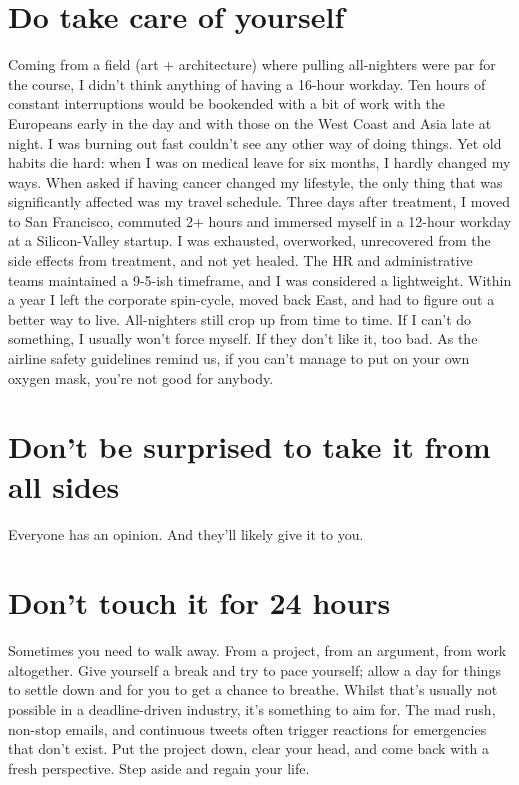 \section*{Do take care of yourself}
Coming from a field (art + architecture) where pulling all-nighters were par for the course, I didn't think anything of having a 16-hour workday. Ten hours of constant interruptions would be bookended with a bit of work with the Europeans early in the day and with those on the West Coast and Asia late at night. I was burning out fast couldn't see any other way of doing things. Yet old habits die hard: when I was on medical leave for six months, I hardly changed my ways. When asked if having cancer changed my lifestyle, the only thing that was significantly affected was my travel schedule. Three days after treatment, I moved to San Francisco, commuted 2+ hours and immersed myself in a 12-hour workday at a Silicon-Valley startup. I was exhausted, overworked, unrecovered from the side effects from treatment, and not yet healed. The HR and administrative teams maintained a 9-5-ish timeframe, and I was considered a lightweight. Within a year I left the corporate spin-cycle, moved back East, and had to figure out a better way to live. All-nighters still crop up from time to time. If I can't do something, I usually won't force myself. If they don't like it, too bad. As the airline safety guidelines remind us, if you can't manage to put on your own oxygen mask, you're not good for anybody.

\section*{Don't be surprised to take it from all sides}
Everyone has an opinion. And they'll likely give it to you.

\section*{Don't touch it for 24 hours}
Sometimes you need to walk away. From a project, from an argument, from work altogether. Give yourself a break and try to pace yourself; allow a day for things to settle down and for you to get a chance to breathe. Whilst that's usually not possible in a deadline-driven industry, it's something to aim for. The mad rush, non-stop emails, and continuous tweets often trigger reactions for emergencies that don't exist. Put the project down, clear your head, and come back with a fresh perspective. Step aside and regain your life.

